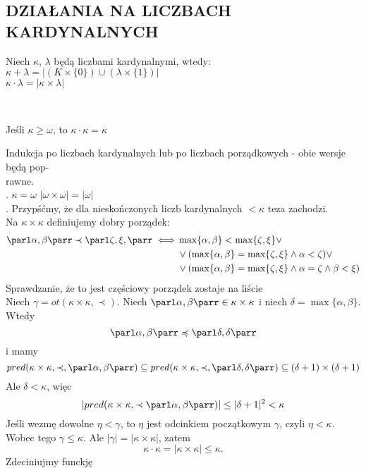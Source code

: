 \subsection{DZIAŁANIA NA LICZBACH KARDYNALNYCH}
\begin{center}\large
    Niech $\kappa$, $\lambda$ będą liczbami kardynalnymi, wtedy:\medskip\\
    $\kappa+\lambda = |(K\times\{0\})\cup(\lambda\times\{1\})|$\medskip\\
    $\kappa\cdot\lambda = |\kappa\times\lambda|$
\end{center}\bigskip
{}\bigskip\\
\begin{center}\large
    Jeśli $\kappa\geq\omega$, to $\kappa\cdot\kappa = \kappa$
\end{center}
\dowod
Indukcja po liczbach kardynalnych lub po liczbach porządkowych - obie wersje będą pop-\\rawne.\medskip\\
. $\kappa=\omega$ $|\omega\times\omega|=|\omega|$\medskip\\
. Przypśćmy, że dla nieskończonych liczb kardynalnych $<\kappa$ teza zachodzi.\smallskip\\
Na $\kappa\times\kappa$ definiujemy dobry porządek:
\begin{align*}
    \parl\alpha,\beta\parr\prec\parl\zeta,\xi,\parr\iff&\max\{\alpha,\beta\}<\max\{\zeta,\xi\}\lor\\
    &\lor(\max\{\alpha,\beta\}=\max\{\zeta,\xi\}\land\alpha<\zeta)\lor\\
    &\lor(\max\{\alpha,\beta\}=\max\{\zeta,\xi\}\land\alpha=\zeta\land\beta<\xi)
\end{align*}
Sprawdzanie, że to jest częściowy porządek zostaje na liście\medskip\\
Niech $\gamma=ot(\kappa\times\kappa,\prec)$. Niech $\parl\alpha,\beta\parr\in\kappa\times\kappa$ i niech $\delta = \max\{\alpha,\beta\}$. Wtedy
$$\parl\alpha,\beta\parr\preccurlyeq\parl\delta,\delta\parr$$
i mamy
$$pred(\kappa\times\kappa,\prec,\parl\alpha,\beta\parr)\subseteq pred(\kappa\times\kappa,\prec,\parl\delta,\delta\parr)\subseteq(\delta+1)\times(\delta+1)$$
Ale $\delta<\kappa$, więc
$$|pred(\kappa\times\kappa,\prec\parl\alpha,\beta\parr)|\leq|\delta+1|^2<\kappa$$
Jeśli wezmę dowolne $\eta<\gamma$, to $\eta$ jest odcinkiem początkowym $\gamma$, czyli $\eta<\kappa$. Wobec tego $\gamma\leq\kappa$. Ale $|\gamma|=|\kappa\times\kappa|$, zatem
$$\kappa\cdot\kappa=|\kappa\times\kappa|\leq\kappa.$$
Zdeciniujmy funckję 
